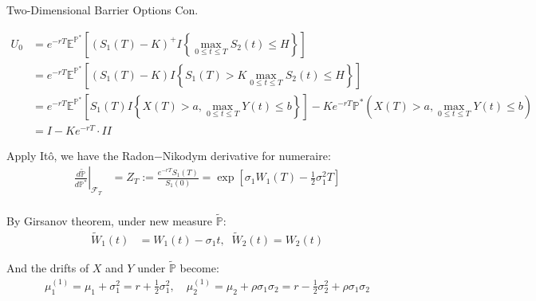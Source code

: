 \documentclass{beamer}
\begin{document}
\begin{frame}{Two-Dimensional Barrier Options Con.}

    {\footnotesize \scriptsize
    \begin{align*}
        U_0 & = e^{-rT} \mathbb{E}^{\mathbb{P}^*}\left[ (S_1(T) - K)^+ 
       I{\left\{ \max_{0 \leq t \leq T} S_2(t) \leq H \right\}} \right]\\
       &= e^{-rT} \mathbb{E}^{\mathbb{P}^*}\left[ (S_1(T) - K) 
       I{\left\{S_1(T) > K \max_{0 \leq t \leq T} S_2(t) \leq H \right\}} \right]\\
       &= e^{-rT} \mathbb{E}^{\mathbb{P}^*}\left[ S_1(T) I{\left\{ X(T) > a, \max\limits_{0 \leq t \leq T} Y(t) \leq b \right\}} \right] 
       - Ke^{-rT} {\mathbb{P}^*}(X(T) > a, \max\limits_{0 \leq t \leq T} Y(t) \leq b)\\
       &= I - Ke^{-rT} \cdot II 
    \end{align*}
    
    \par Apply Itô, we have the Radon$-$Nikodym derivative for numeraire:
    \begin{align*}
        \left.\frac{d\tilde{\mathbb{P}}}{d\mathbb{P}^*}\right|_{\mathcal{F}_T}& = Z_T := \frac{e^{-rT} S_1(T)}{S_1(0)}
         = \exp \left[ \sigma_1W_1(T) - \frac{1}{2}\sigma_1^2 T \right]\\
    \end{align*}
    \par \vspace{-2em}
    \par By Girsanov theorem, under new measure $\tilde{\mathbb{P}}$:
    \begin{align*}
        \tilde{W}_1(t) &= W_1(t) - \sigma_1 t, \;\; \tilde{W}_2(t) = W_2(t)
    \end{align*}
    \par And the drifts of $X$ and $Y$ under $\tilde{\mathbb{P}}$ become:
    \begin{align*}
        \mu_1^{(1)} = \mu_1 + \sigma_1^2 = r + \frac{1}{2}\sigma_1^2, 
        \quad \mu_2^{(1)} = \mu_2 + \rho\sigma_1\sigma_2 = r - \frac{1}{2}\sigma_2^2 + \rho\sigma_1\sigma_2
    \end{align*}
    }
\end{frame}
\end{document}
